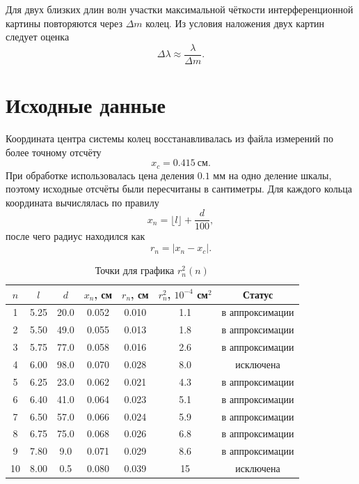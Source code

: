 \documentclass[twoside]{mfitjournal}
\begin{document}
Для двух близких длин волн участки максимальной чёткости интерференционной картины повторяются через $\Delta m$ колец. Из условия наложения двух картин следует оценка
\begin{equation}
\Delta \lambda \approx \frac{\lambda}{\Delta m}.
\end{equation}

\section*{Исходные данные}

Координата центра системы колец восстанавливалась из файла измерений по более точному отсчёту
\[
x_c = 0.415\ \text{см}.
\]
При обработке использовалась цена деления $0.1$ мм на одно деление шкалы, поэтому исходные отсчёты были пересчитаны в сантиметры.
Для каждого кольца координата вычислялась по правилу
\begin{equation}
x_n = \lfloor l \rfloor + \frac{d}{100},
\end{equation}
после чего радиус находился как
\begin{equation}
r_n = |x_n - x_c|.
\end{equation}

\begin{table}[H]
\centering
\caption{Точки для графика $r_n^2(n)$}
\begin{tabular}{ccccccc}
\toprule
$n$ & $l$ & $d$ & $x_n$, см & $r_n$, см & $r_n^2$, $10^{-4}$ см$^2$ & Статус \\
\midrule
1  & 5.25 & 20.0 & 0.052 & 0.010 & 1.1 & в аппроксимации \\
2  & 5.50 & 49.0 & 0.055 & 0.013 & 1.8 & в аппроксимации \\
3  & 5.75 & 77.0 & 0.058 & 0.016 & 2.6 & в аппроксимации \\
4  & 6.00 & 98.0 & 0.070 & 0.028 & 8.0 & исключена \\
5  & 6.25 & 23.0 & 0.062 & 0.021 & 4.3 & в аппроксимации \\
6  & 6.40 & 41.0 & 0.064 & 0.023 & 5.1 & в аппроксимации \\
7  & 6.50 & 57.0 & 0.066 & 0.024 & 5.9 & в аппроксимации \\
8  & 6.75 & 75.0 & 0.068 & 0.026 & 6.8 & в аппроксимации \\
9  & 7.80 & 9.0  & 0.071 & 0.029 & 8.6 & в аппроксимации \\
10 & 8.00 & 0.5  & 0.080 & 0.039 & 15 & исключена \\
\bottomrule
\end{tabular}
\end{table}
\end{document}
